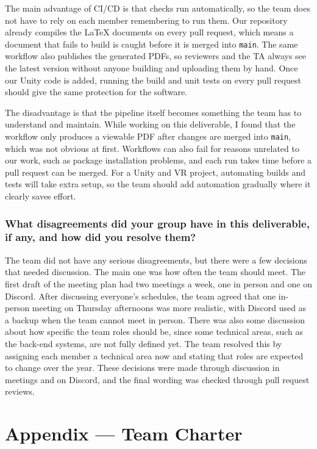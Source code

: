 \documentclass{article}
\begin{document}
The main advantage of CI/CD is that checks run automatically, so the team
does not have to rely on each member remembering to run them. Our repository
already compiles the \LaTeX{} documents on every pull request, which means a
document that fails to build is caught before it is merged into
\texttt{main}. The same workflow also publishes the generated PDFs, so
reviewers and the TA always see the latest version without anyone building
and uploading them by hand. Once our Unity code is added, running the build
and unit tests on every pull request should give the same protection for the
software.

The disadvantage is that the pipeline itself becomes something the team has
to understand and maintain. While working on this deliverable, I found that
the workflow only produces a viewable PDF after changes are merged into
\texttt{main}, which was not obvious at first. Workflows can also fail for
reasons unrelated to our work, such as package installation problems, and
each run takes time before a pull request can be merged. For a Unity and VR
project, automating builds and tests will take extra setup, so the team
should add automation gradually where it clearly saves effort.

\subsubsection*{What disagreements did your group have in this deliverable, if any,
    and how did you resolve them?}

The team did not have any serious disagreements, but there were a few
decisions that needed discussion. The main one was how often the team should
meet. The first draft of the meeting plan had two meetings a week, one in
person and one on Discord. After discussing everyone's schedules, the team
agreed that one in-person meeting on Thursday afternoons was more realistic,
with Discord used as a backup when the team cannot meet in person. There was
also some discussion about how specific the team roles should be, since some
technical areas, such as the back-end systems, are not fully defined yet. The
team resolved this by assigning each member a technical area now and stating
that roles are expected to change over the year. These decisions were made
through discussion in meetings and on Discord, and the final wording was
checked through pull request reviews.

\newpage{}

\section*{Appendix --- Team Charter}
\end{document}
